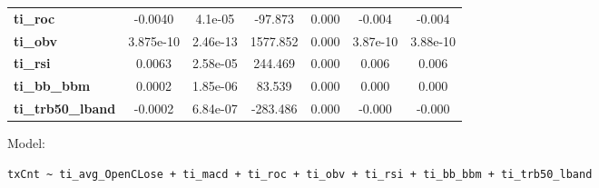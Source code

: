 \begin{center}
\begin{tabular}{lcccccc}
\textbf{ti\_roc}            &      -0.0040  &      4.1e-05     &   -97.873  &         0.000        &       -0.004    &       -0.004     \\
\textbf{ti\_obv}            &    3.875e-10  &     2.46e-13     &  1577.852  &         0.000        &     3.87e-10    &     3.88e-10     \\
\textbf{ti\_rsi}            &       0.0063  &     2.58e-05     &   244.469  &         0.000        &        0.006    &        0.006     \\
\textbf{ti\_bb\_bbm}        &       0.0002  &     1.85e-06     &    83.539  &         0.000        &        0.000    &        0.000     \\
\textbf{ti\_trb50\_lband}   &      -0.0002  &     6.84e-07     &  -283.486  &         0.000        &       -0.000    &       -0.000     \\
\bottomrule
\end{tabular}
\end{center}

Model: \begin{verbatim}txCnt ~ ti_avg_OpenCLose + ti_macd + ti_roc + ti_obv + ti_rsi + ti_bb_bbm + ti_trb50_lband\end{verbatim}

